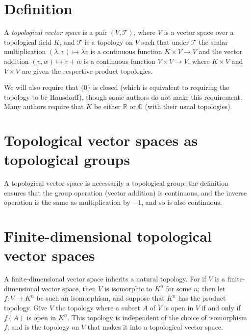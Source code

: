 \documentclass[12pt]{article}
\def\R{\mathbb{R}}
\def\C{\mathbb{C}}
\begin{document}

\section*{Definition}

A \emph{topological vector space} is a pair $(V,\mathcal{T})$,
where $V$ is a vector space over a topological field $K$,
and $\mathcal{T}$ is a topology on $V$ such that under $\mathcal{T}$
the scalar multiplication $(\lambda,v)\mapsto\lambda v$
is a continuous function $K\times V\to V$
and the vector addition $(v,w)\mapsto v+w$
is a continuous function $V\times V\to V$,
where $K\times V$ and $V\times V$ are given the respective product topologies.

We will also require that $\{0\}$ is closed
(which is equivalent to requiring the topology to be Hausdorff),
though some authors do not make this requirement.
Many authors require that $K$ be either $\R$ or $\C$
(with their usual topologies).

\section*{Topological vector spaces as topological groups}

A topological vector space is necessarily a topological group:
the definition ensures that the group operation (vector addition) is continuous,
and the inverse operation is the same as multiplication by $-1$,
and so is also continuous.

\section*{Finite-dimensional topological vector spaces}

A finite-dimensional vector space inherits a natural topology.
For if $V$ is a finite-dimensional vector space,
then $V$ is isomorphic to $K^n$ for some $n$;
then let $f\colon V\to K^n$ be such an isomorphism,
and suppose that $K^n$ has the product topology.
Give $V$ the topology where a subset $A$ of $V$ is open in $V$
if and only if $f(A)$ is open in $K^n$.
This topology is independent of the choice of isomorphism $f$,
and is the  topology on $V$
that makes it into a topological vector space.
\end{document}
